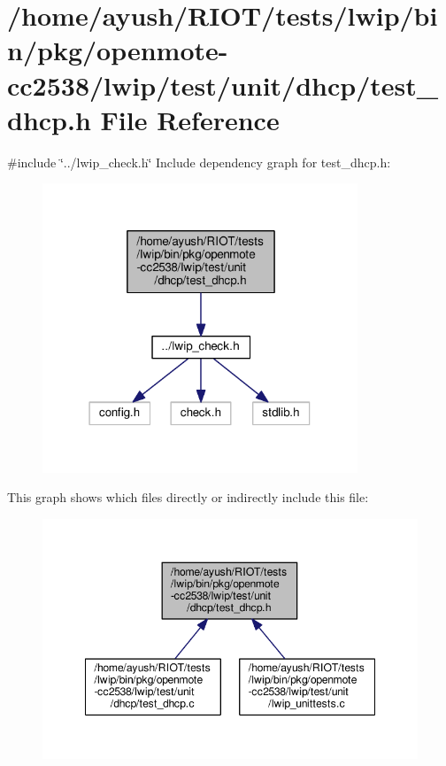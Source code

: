 \hypertarget{openmote-cc2538_2lwip_2test_2unit_2dhcp_2test__dhcp_8h}{}\section{/home/ayush/\+R\+I\+O\+T/tests/lwip/bin/pkg/openmote-\/cc2538/lwip/test/unit/dhcp/test\+\_\+dhcp.h File Reference}
\label{openmote-cc2538_2lwip_2test_2unit_2dhcp_2test__dhcp_8h}
{\ttfamily \#include \char`\"{}../lwip\+\_\+check.\+h\char`\"{}}\newline
Include dependency graph for test\+\_\+dhcp.\+h\+:
\nopagebreak
\begin{figure}[H]
\begin{center}
\leavevmode
\includegraphics[width=267pt]{openmote-cc2538_2lwip_2test_2unit_2dhcp_2test__dhcp_8h__incl}
\end{center}
\end{figure}
This graph shows which files directly or indirectly include this file\+:
\nopagebreak
\begin{figure}[H]
\begin{center}
\leavevmode
\includegraphics[width=348pt]{openmote-cc2538_2lwip_2test_2unit_2dhcp_2test__dhcp_8h__dep__incl}
\end{center}
\end{figure}
